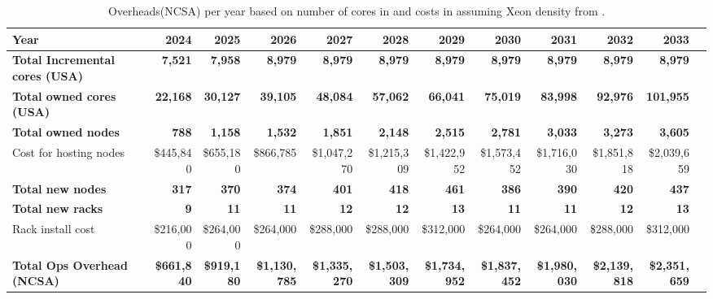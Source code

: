 \tiny \begin{longtable} { |p{}  |r  |r  |r  |r  |r  |r  |r  |r  |r  |r  |r |} 
\caption{Overheads(NCSA) per year based on number of cores in  and costs in  assuming Xeon density from .  \label{tab:opsOverheadCost}}\\ 
\hline 
\textbf{Year}&\textbf{2024}&\textbf{2025}&\textbf{2026}&\textbf{2027}&\textbf{2028}&\textbf{2029}&\textbf{2030}&\textbf{2031}&\textbf{2032}&\textbf{2033} \\ \hline
\textbf{Total Incremental cores (USA)}&\textbf{7,521}&\textbf{7,958}&\textbf{8,979}&\textbf{8,979}&\textbf{8,979}&\textbf{8,979}&\textbf{8,979}&\textbf{8,979}&\textbf{8,979}&\textbf{8,979} \\ \hline
\textbf{Total owned cores (USA)}&\textbf{22,168}&\textbf{30,127}&\textbf{39,105}&\textbf{48,084}&\textbf{57,062}&\textbf{66,041}&\textbf{75,019}&\textbf{83,998}&\textbf{92,976}&\textbf{101,955} \\ \hline
\textbf{Total owned nodes}&\textbf{788}&\textbf{1,158}&\textbf{1,532}&\textbf{1,851}&\textbf{2,148}&\textbf{2,515}&\textbf{2,781}&\textbf{3,033}&\textbf{3,273}&\textbf{3,605} \\ \hline
{Cost for hosting nodes }&{\$445,840}&{\$655,180}&{\$866,785}&{\$1,047,270}&{\$1,215,309}&{\$1,422,952}&{\$1,573,452}&{\$1,716,030}&{\$1,851,818}&{\$2,039,659} \\ \hline
\textbf{Total new nodes}&\textbf{317}&\textbf{370}&\textbf{374}&\textbf{401}&\textbf{418}&\textbf{461}&\textbf{386}&\textbf{390}&\textbf{420}&\textbf{437} \\ \hline
\textbf{Total new racks}&\textbf{9}&\textbf{11}&\textbf{11}&\textbf{12}&\textbf{12}&\textbf{13}&\textbf{11}&\textbf{11}&\textbf{12}&\textbf{13} \\ \hline
{Rack install cost }&{\$216,000}&{\$264,000}&{\$264,000}&{\$288,000}&{\$288,000}&{\$312,000}&{\$264,000}&{\$264,000}&{\$288,000}&{\$312,000} \\ \hline
\textbf{Total Ops Overhead (NCSA)}&\textbf{\$661,840}&\textbf{\$919,180}&\textbf{\$1,130,785}&\textbf{\$1,335,270}&\textbf{\$1,503,309}&\textbf{\$1,734,952}&\textbf{\$1,837,452}&\textbf{\$1,980,030}&\textbf{\$2,139,818}&\textbf{\$2,351,659} \\ \hline
\end{longtable} \normalsize

